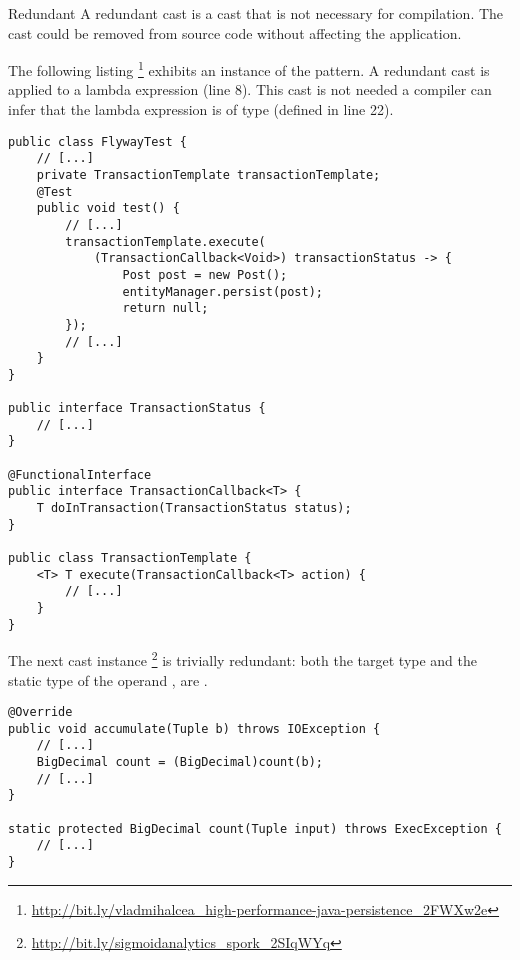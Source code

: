 \begin{pattern}{Redundant}
A redundant cast is a cast that is not necessary for compilation.
The cast could be removed from source code without affecting the application.

\instances{}
%
The following listing%
\footnote{\url{http://bit.ly/vladmihalcea_high-performance-java-persistence_2FWXw2e}}
exhibits an instance of the \thisp{} pattern.
A redundant cast is applied to a lambda expression (line 8).
This cast is not needed a \java{} compiler can infer that the lambda expression is of type  (defined in line 22).

\begin{verbatim}
public class FlywayTest {
    // [...]
    private TransactionTemplate transactionTemplate;
    @Test
    public void test() {
        // [...]
        transactionTemplate.execute(
            (TransactionCallback<Void>) transactionStatus -> {
                Post post = new Post();
                entityManager.persist(post);
                return null;
        });
        // [...]
    }
}

public interface TransactionStatus {
    // [...]
}

@FunctionalInterface
public interface TransactionCallback<T> {	
	T doInTransaction(TransactionStatus status);
}

public class TransactionTemplate {
	<T> T execute(TransactionCallback<T> action) {
        // [...]
	}
}
\end{verbatim}

The next cast instance%
\footnote{\url{http://bit.ly/sigmoidanalytics_spork_2SIqWYq}}
is trivially redundant: both the target type and the static type of the
  operand ,
  are .

\begin{verbatim}
@Override
public void accumulate(Tuple b) throws IOException {
    // [...]
    BigDecimal count = (BigDecimal)count(b);
    // [...]
}

static protected BigDecimal count(Tuple input) throws ExecException {
    // [...]
}
\end{verbatim}


\end{pattern}
